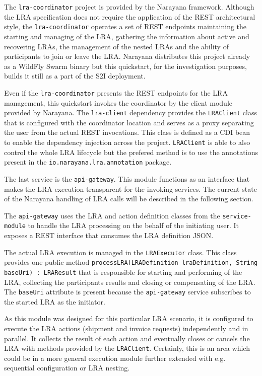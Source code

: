 \documentclass[oneside,
  digital, %
  table,   %
  nolof,     %
  nolot,     %
]{fithesis3}
\begin{document}
The \texttt{lra-coordinator} project is provided by the Narayana framework. Although the LRA specification does not require the application of the REST architectural style, the \texttt{lra-coordinator} operates a set of REST endpoints maintaining the starting and managing of the LRA, gathering the information about active and recovering LRAs, the management of the nested LRAs and the ability of participants to join or leave the LRA. Narayana distributes this project already as a WildFly Swarm binary but this quickstart, for the investigation purposes, builds it still as a part of the S2I deployment.

Even if the \texttt{lra-coordinator} presents the REST endpoints for the LRA management, this quickstart invokes the coordinator by the client module provided by Narayana. The \texttt{lra-client} dependency provides the \texttt{LRAClient} class that is configured with the coordinator location and serves as a proxy separating the user from the actual REST invocations. This class is defined as a CDI bean to enable the dependency injection across the project. \texttt{LRAClient} is able to also control the whole LRA lifecycle but the prefered method is to use the annotations present in the \texttt{io.narayana.lra.annotation} package.

The last service is the \texttt{api-gateway}. This module functions as an interface that makes the LRA execution transparent for the invoking services. The current state of the Narayana handling of LRA calls will be described in the following section.

The \texttt{api-gateway} uses the LRA and action definition classes from the \texttt{service-module} to handle the LRA processing on the behalf of the initiating user. It exposes a REST interface that consumes the LRA definition JSON.

The actual LRA execution is managed in the \texttt{LRAExecutor} class. This class provides one public method \texttt{processLRA(LRADefinition lraDefinition, String baseUri) : LRAResult} that is responsible for starting and performing of the LRA, collecting the participants results and closing or compensating of the LRA. The \texttt{baseUri} attribute is present because the \texttt{api-gateway} service subscribes to the started LRA as the initiator.

As this module was designed for this particular LRA scenario, it is configured to execute the LRA actions (shipment and invoice requests) independently and in parallel. It collects the result of each action and eventually closes or cancels the LRA with methods provided by the \texttt{LRAClient}. Certainly, this is an area which could be in a more general execution module further extended with e.g. sequential configuration or LRA nesting.
\end{document}
